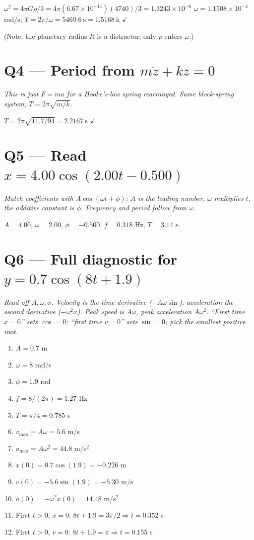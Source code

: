 \documentclass[11pt]{article}
\newcommand{\checkmk}{\ensuremath{\checkmark}}
\begin{document}
$\omega^2 = 4\pi G\rho/3 = 4\pi(6.67\times10^{-11})(4740)/3 = 1.3243\times10^{-6}$
$\omega = 1.1508\times10^{-3}$ rad/s; $T = 2\pi/\omega = 5460.6\ \text{s} = \boxed{1.5168\ \text{h}}$ \checkmk

(Note: the planetary radius $R$ is a distractor; only $\rho$ enters $\omega$.)

\section*{Q4 --- Period from $m\ddot z + kz = 0$}
\emph{This is just $F=ma$ for a Hooke's-law spring rearranged. Same block-spring system; $T = 2\pi\sqrt{m/k}$.}

$T = 2\pi\sqrt{11.7/94} = \boxed{2.2167\ \text{s}}$ \checkmk

\section*{Q5 --- Read $x = 4.00\cos(2.00t - 0.500)$}
\emph{Match coefficients with $A\cos(\omega t + \phi)$: $A$ is the leading number, $\omega$ multiplies $t$, the additive constant is $\phi$. Frequency and period follow from $\omega$.}

$A=\mathbf{4.00}$, $\omega=\mathbf{2.00}$, $\phi=\mathbf{-0.500}$, $f=\mathbf{0.318}$ Hz, $T=\mathbf{3.14}$ s.

\section*{Q6 --- Full diagnostic for $y = 0.7\cos(8t+1.9)$}
\emph{Read off $A,\omega,\phi$. Velocity is the time derivative ($-A\omega\sin$), acceleration the second derivative ($-\omega^2 x$). Peak speed is $A\omega$, peak acceleration $A\omega^2$. ``First time $x=0$'' sets $\cos = 0$; ``first time $v=0$'' sets $\sin=0$; pick the smallest positive root.}

\begin{enumerate}[label=(\alph*),leftmargin=*]
\item $A=0.7$ m
\item $\omega=8$ rad/s
\item $\phi=1.9$ rad
\item $f = 8/(2\pi) = 1.27$ Hz
\item $T = \pi/4 = 0.785$ s
\item $v_{\max} = A\omega = 5.6$ m/s
\item $a_{\max} = A\omega^2 = 44.8$ m/s$^2$
\item $x(0) = 0.7\cos(1.9) = -0.226$ m
\item $v(0) = -5.6\sin(1.9) = -5.30$ m/s
\item $a(0) = -\omega^2 x(0) = 14.48$ m/s$^2$
\item First $t>0$, $x=0$: $8t + 1.9 = 3\pi/2 \Rightarrow t = 0.352$ s
\item First $t>0$, $v=0$: $8t + 1.9 = \pi \Rightarrow t = 0.155$ s
\end{enumerate}
\end{document}
